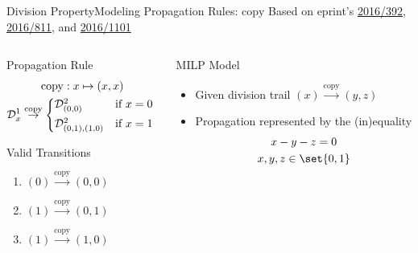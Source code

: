 \begin{frame}{Division Property}{Modeling Propagation Rules: $\mathrm{copy}$}
    \centering
    Based on eprint's \href{https://ia.cr/2016/392}{2016/392}, \href{https://ia.cr/2016/811}{2016/811}, and \href{https://ia.cr/2016/1101}{2016/1101}
    \begin{columns}
        \begin{column}{0.35\textwidth}
            \begin{block}{Propagation Rule}
                \vspace*{-15pt}
                \begin{gather*}
                    \mathrm{copy} : x \mapsto (x, x) \\
                    \mathcal{D}^1_x \stackrel{\mathrm{copy}}{\to} \begin{cases*}
                        \mathcal{D}^2_{(0,0)}       & if $x = 0$ \\
                        \mathcal{D}^2_{(0,1),(1,0)} & if $x = 1$
                    \end{cases*}
                \end{gather*}
                \vspace*{-3pt}
            \end{block}
            \begin{block}{Valid Transitions}
                \begin{enumerate}
                    \item \quad $(0) \stackrel{\mathrm{copy}}{\to} (0, 0)$
                    \item \quad $(1) \stackrel{\mathrm{copy}}{\to} (0, 1)$
                    \item \quad $(1) \stackrel{\mathrm{copy}}{\to} (1, 0)$
                \end{enumerate}
            \end{block}
            \pause
        \end{column}
        \begin{column}{0.575\textwidth}
            \begin{block}{MILP Model}
                \begin{itemize}
                    \item Given division trail $(x) \stackrel{\mathrm{copy}}{\to} (y, z)$\\[2pt]
                    \item Propagation represented by the (in)equality
                        \begin{gather*}
                            x - y - z = 0\\
                            x, y, z \in \set{0,1}
                        \end{gather*}
                \end{itemize}
            \end{block}
        \end{column}
    \end{columns}
\end{frame}


